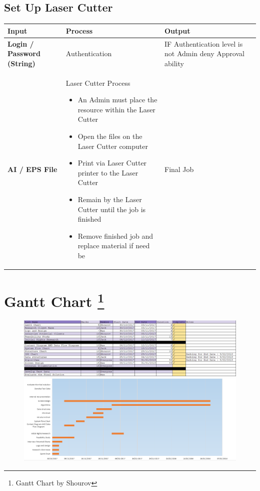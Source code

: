 \documentclass[oneside,openany,11pt,a4paper]{report}
\begin{document}
\subsection{Set Up Laser Cutter}
\begin{longtable}{|p{3cm}|p{5cm}|p{4cm}|}	
	\hline
	\rowcolor{gray!40}
	\textbf{Input} & \textbf{Process}  & \textbf{Output} \\ \hline
	
	\rowcolor{white}
	\textbf{Login / Password (String)} &  
	Authentication
	&  IF Authentication level is not Admin deny Approval ability \\ \hline
	
	\rowcolor{gray!25}
	\textbf{AI / EPS File} &  
	Laser Cutter Process
	\begin{itemize}
		\itemsep0em
		\item An Admin must place the resource within the Laser Cutter
		\item Open the files on the Laser Cutter computer
		\item Print via Laser Cutter printer to the Laser Cutter
		\item Remain by the Laser Cutter until the job is finished
		\item Remove finished job and replace material if need be
	\end{itemize}
	& Final Job

	\\ \hline
\end{longtable}

\section[Gantt Chart]{Gantt Chart \protect\footnote{Gantt Chart by Shourov}}
\begin{figure}[!htb]
	\includegraphics[width=\textwidth]{ganttchart1.png}
	\\
	\includegraphics[width=\textwidth]{ganttchart2.png}
\end{figure}
\end{document}
